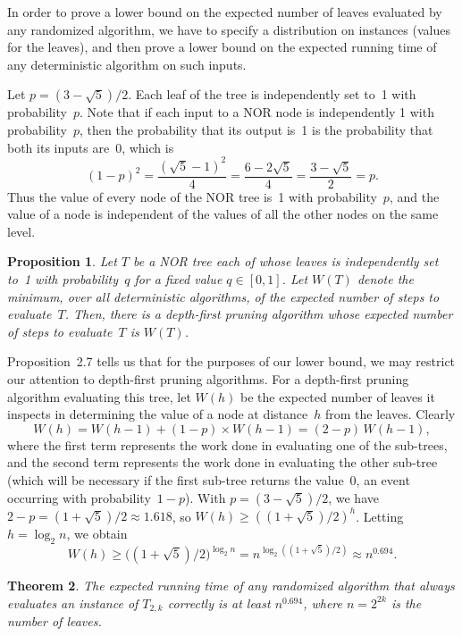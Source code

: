 \documentclass[twoside,12pt]{book}
\theoremstyle{plain}
\newtheorem{theorem}{Theorem}[chapter]
\newtheorem{proposition}[theorem]{Proposition}
\theoremstyle{definition}
\theoremstyle{remark}
\begin{document}
In order to prove a lower bound on the expected number of leaves evaluated by
any randomized algorithm, we have to specify a distribution on instances
(values for the leaves), and then prove a lower bound on the expected running
time of any deterministic algorithm on such inputs.

Let $p=(3-\sqrt{5})/2$.  Each leaf of the tree is independently set to~1
with probability~$p$.  Note that if each input to a NOR node is independently
1 with probability~$p$, then the probability that its output is~1 is the
probability that both its inputs are~0, which is
\[
  (1-p)^2 = \frac{(\sqrt{5}-1)^2}{4} = \frac{6-2\sqrt{5}}{4}
  = \frac{3-\sqrt{5}}{2} = p.
\]
Thus the value of every node of the NOR tree is~1 with probability~$p$, and
the value of a node is independent of the values of all the other nodes on
the same level.

\begin{proposition}
Let $T$ be a NOR tree each of whose leaves is independently set to~1 with
probability~$q$ for a fixed value $q\in[0,1]$.  Let $W(T)$ denote the
minimum, over all deterministic algorithms, of the expected number of steps to
evaluate~$T$.  Then, there is a depth-first pruning algorithm whose expected
number of steps to evaluate~$T$ is $W(T)$.
\end{proposition}

Proposition~2.7 tells us that for the purposes of our lower bound, we may
restrict our attention to depth-first pruning algorithms.  For a depth-first
pruning algorithm evaluating this tree, let $W(h)$ be the expected number of
leaves it inspects in determining the value of a node at distance~$h$ from
the leaves.  Clearly
\[
  W(h) = W(h-1) + (1-p)\times W(h-1) = (2-p)\,W(h-1),
\]
where the first term represents the work done in evaluating one of the
sub-trees, and the second term represents the work done in evaluating the
other sub-tree (which will be necessary if the first sub-tree returns the
value~0, an event occurring with probability~$1-p$).  With $p=(3-\sqrt5)/2$,
we have $2-p = (1+\sqrt5)/2 \approx 1.618$, so $W(h) \ge ((1+\sqrt5)/2)^h$.
Letting $h=\log_2 n$, we obtain
\[
  W(h) \ge \bigl((1+\sqrt5)/2\bigr)^{\log_2 n}
        = n^{\log_2((1+\sqrt5)/2)} \approx n^{0.694}.
\]

\begin{theorem}
\label{thm:lowerbound}
The expected running time of any randomized algorithm that always evaluates an
instance of $T_{2,k}$ correctly is at least $n^{0.694}$, where $n=2^{2k}$ is
the number of leaves.
\end{theorem}
\end{document}
